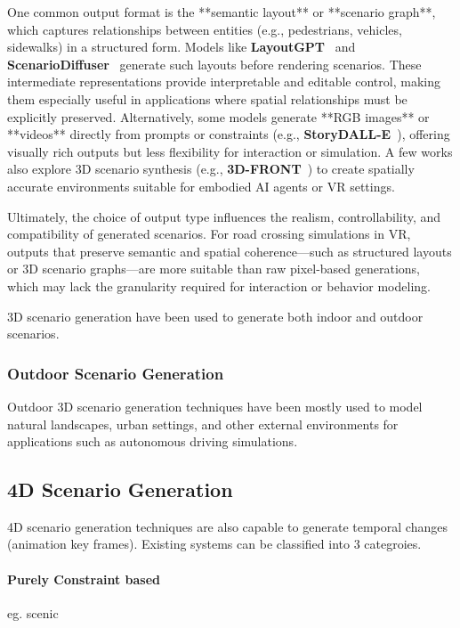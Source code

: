 \documentclass{article}
\begin{document}
\begin{table}[ht]
One common output format is the **semantic layout** or **scenario graph**, which captures relationships between entities (e.g., pedestrians, vehicles, sidewalks) in a structured form. Models like \textbf{LayoutGPT}~\cite{feng2023layoutgpt} and \textbf{ScenarioDiffuser}~\cite{yang2023scenariodiffuser} generate such layouts before rendering scenarios. These intermediate representations provide interpretable and editable control, making them especially useful in applications where spatial relationships must be explicitly preserved. Alternatively, some models generate **RGB images** or **videos** directly from prompts or constraints (e.g., \textbf{StoryDALL-E}~\cite{storydalle}), offering visually rich outputs but less flexibility for interaction or simulation. A few works also explore 3D scenario synthesis (e.g., \textbf{3D-FRONT}~\cite{fu20213dfront}) to create spatially accurate environments suitable for embodied AI agents or VR settings.

Ultimately, the choice of output type influences the realism, controllability, and compatibility of generated scenarios. For road crossing simulations in VR, outputs that preserve semantic and spatial coherence—such as structured layouts or 3D scenario graphs—are more suitable than raw pixel-based generations, which may lack the granularity required for interaction or behavior modeling.


3D scenario generation have been used to generate both indoor and outdoor scenarios.


\subsubsection{Outdoor Scenario Generation}

Outdoor 3D scenario generation techniques have been mostly used to model natural landscapes, urban settings, and other external environments for applications such as autonomous driving simulations.

\subsection{4D Scenario Generation}

4D scenario generation techniques are also capable to generate temporal changes (animation key frames). Existing systems can be classified into 3 categroies.

\paragraph{Purely Constraint based} eg. scenic


\end{table}
\end{document}
